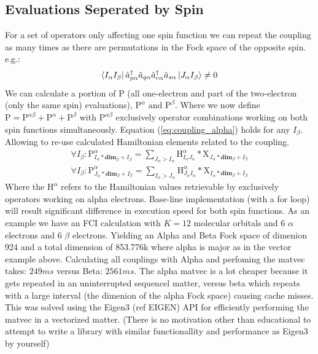 \subsection{Evaluations Seperated by Spin}
For a set of operators only affecting one spin function we can repeat the coupling as many times as there are permutations in the Fock space of the opposite spin. e.g.:
\begin{equation} \label{eq:coupling_alpha}
  \bra{I_\alpha I_\beta} \hat{a}^{\dagger}_{p \alpha} \hat{a}_{q \alpha} \hat{a}^{\dagger}_{r \alpha} \hat{a}_{s \alpha} \ket{J_\alpha I_\beta} \neq 0
\end{equation}
We can calculate a portion of P (all one-electron and part of the two-electron (only the same spin) evaluations), $\text{P}^{\alpha}$ and $\text{P}^{\beta}$.
Where we now define $\text{P} = \text{P}^{\alpha \beta} + \text{P}^{\alpha} + \text{P}^{\beta}$ with $\text{P}^{\alpha \beta}$ exclusively operator combinations working on both spin functions simultaneously.
Equation (\ref{eq:coupling_alpha}) holds for any $I_\beta$.
Allowing to re-use calculated Hamiltonian elements related to the coupling.
\begin{align}
  \forall I_\beta: \text{P}^{\alpha}_{I_\alpha * \textbf{dim}_\beta + I_\beta} = \sum_{J_\alpha > I_\alpha} \text{H}^{\alpha}_{I_\alpha J_\alpha} * \text{X}_{J_\alpha * \textbf{dim}_\beta + I_\beta} \\
  \forall I_\beta: \text{P}^{\alpha}_{J_\alpha * \textbf{dim}_\beta + I_\beta} = \sum_{I_\alpha > J_\alpha} \text{H}^{\alpha}_{J_\alpha I_\alpha} * \text{X}_{I_\alpha * \textbf{dim}_\beta + I_\beta}
\end{align}
Where the $\text{H}^{\alpha}$ refers to the Hamiltonian values retrievable by exclusively operators working on alpha electrons.
Base-line implementation (with a for loop) will result significant difference in execution speed for both spin functions.
As an example we have an FCI calculation with $K=12$ molecular orbitals and 6 $\alpha$ electrons and 6 $\beta$ electrons.
Yielding an Alpha and Beta Fock space of dimenion 924 and a total dimension of 853.776k where alpha is major as in the vector example above.
Calculating all couplings with Alpha and perfoming the matvec takes: $249 ms$ versus Beta: $2561 ms$.
The alpha matvec is a lot cheaper because it gets repeated in an uninterrupted sequencel matter, versus beta which repeats with a large interval (the dimenion of the alpha Fock space) causing cache misses. This was solved using the Eigen3 (ref EIGEN) API for efficiently performing the matvec in a vectorized matter. (There is no motivation other than educational to attempt to write a library with similar functionallity and performance as Eigen3 by yourself)

